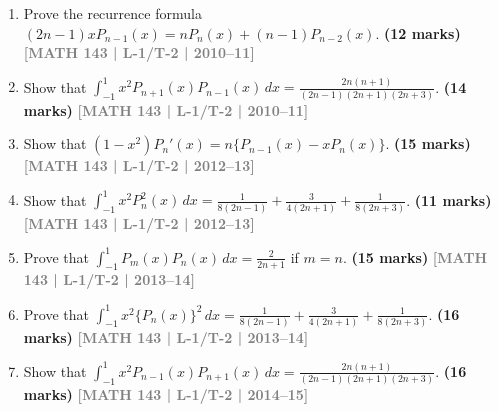 \documentclass[12pt,a4paper]{article}
\newcommand{\yr}[1]{\hfill\textcolor{gray}{\small\textbf{[#1]}}}
\newcommand{\mk}[1]{\textcolor{orange!70!black}{\small\textbf{(#1 marks)}}}
\begin{document}
\begin{enumerate}

\item Prove the recurrence formula $(2n-1)xP_{n-1}(x)=nP_{n}(x)+(n-1)P_{n-2}(x)$.
\mk{12} \yr{MATH 143 | L-1/T-2 | 2010--11}

\item Show that $\displaystyle\int_{-1}^{1}x^{2}P_{n+1}(x)P_{n-1}(x)\,dx=\frac{2n(n+1)}{(2n-1)(2n+1)(2n+3)}$.
\mk{14\textonehalf} \yr{MATH 143 | L-1/T-2 | 2010--11}

\item Show that $(1-x^{2})P_{n}'(x)=n\{P_{n-1}(x)-xP_{n}(x)\}$.
\mk{15} \yr{MATH 143 | L-1/T-2 | 2012--13}

\item Show that $\displaystyle\int_{-1}^{1}x^{2}P_{n}^{2}(x)\,dx=\frac{1}{8(2n-1)}+\frac{3}{4(2n+1)}+\frac{1}{8(2n+3)}$.
\mk{11\textonehalf} \yr{MATH 143 | L-1/T-2 | 2012--13}

\item Prove that $\displaystyle\int_{-1}^{1}P_{m}(x)P_{n}(x)\,dx=\frac{2}{2n+1}$ if $m=n$.
\mk{15} \yr{MATH 143 | L-1/T-2 | 2013--14}

\item Prove that $\displaystyle\int_{-1}^{1}x^{2}\{P_{n}(x)\}^{2}\,dx=\frac{1}{8(2n-1)}+\frac{3}{4(2n+1)}+\frac{1}{8(2n+3)}$.
\mk{16\textonehalf} \yr{MATH 143 | L-1/T-2 | 2013--14}

\item Show that $\displaystyle\int_{-1}^{1}x^{2}P_{n-1}(x)P_{n+1}(x)\,dx=\frac{2n(n+1)}{(2n-1)(2n+1)(2n+3)}$.
\mk{16\textonehalf} \yr{MATH 143 | L-1/T-2 | 2014--15}

\end{enumerate}
\end{document}
